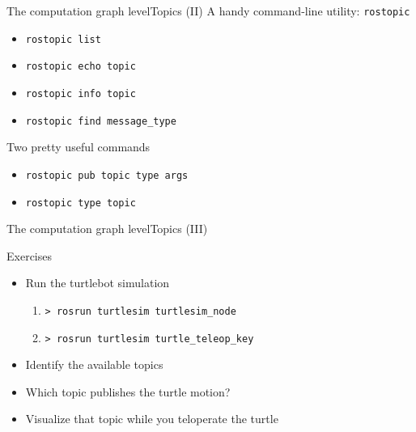 \documentclass[10pt,compress]{beamer} %
\begin{document}
\begin{frame}{The computation graph level}{Topics (II)}
	A handy command-line utility: \alert{\texttt{rostopic}}
  	\begin{itemize}
		\item \texttt{rostopic list}
		\item \texttt{rostopic echo topic}
		\item \texttt{rostopic info topic}
		\item \texttt{rostopic find message\_type}
	\end{itemize}
	Two pretty useful commands
  	\begin{itemize}
		\item \texttt{rostopic pub topic type args}
		\item \texttt{rostopic type topic}
	\end{itemize}
\end{frame}

\begin{frame}{The computation graph level}{Topics (III)}
	\begin{block}{Exercises}
  	\begin{itemize}
		\item Run the turtlebot simulation
			\begin{enumerate}
			\item \texttt{> rosrun turtlesim turtlesim\_node}
			\item \texttt{> rosrun turtlesim turtle\_teleop\_key}
			\end{enumerate}
		\item Identify the available topics
		\item Which topic publishes the turtle motion?
		\item Visualize that topic while you teloperate the turtle
	\end{itemize}
	\end{block}
\end{frame}
\end{document}
